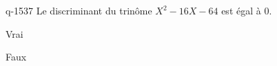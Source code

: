 \begin{truefalse}{q-1537}
Le discriminant du trinôme $X^2-16X-64$ est égal à $0$.
\item Vrai
\item* Faux
\end{truefalse}

